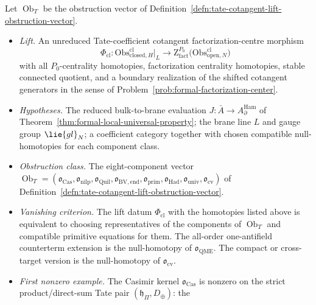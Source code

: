 \documentclass[11pt]{memoir}
\begin{document}
\begin{thm}\label{thm:tate-cotangent-lift-iff}
  Let \(\operatorname{Ob}_T\) be the obstruction vector of
  Definition~\ref{defn:tate-cotangent-lift-obstruction-vector}.
  \begin{itemize}
    \item \emph{Lift.}  An unreduced Tate-coefficient
      cotangent factorization-centre morphism
      \[
        \Phi_{\mathrm{cl}}\colon
        \mathrm{Obs}^{\mathrm{cl}}_{\mathrm{closed},H}\big|_L
          \longrightarrow
        \mathrm Z^{P_0}_{\mathrm{fact}}
          \bigl(\mathrm{Obs}^{\mathrm{cl}}_{\mathrm{open},N}\bigr)
      \]
      with all \(P_0\)-centrality homotopies, factorization centrality
      homotopies, stable connected quotient, and a boundary realization
      of the shifted cotangent generators in the sense of
      Problem~\ref{prob:formal-factorization-center}.
    \item \emph{Hypotheses.} The reduced bulk-to-brane
      evaluation \(J\colon\bar A\to A_\partial^{\mathrm{Ham}}\) of
      Theorem~\ref{thm:formal-local-universal-property}; the brane line
      \(L\) and gauge group \(\lie{gl}_N\); a coefficient category
      together with chosen compatible null-homotopies for each
      component class.
    \item \emph{Obstruction class.} The eight-component vector
      \(\operatorname{Ob}_T=(\mathfrak o_{\mathrm{Cas}},
        \mathfrak o_{\mathrm{nilp}},
        \mathfrak o_{\mathrm{Quil}},
        \mathfrak o_{\mathrm{BV,end}},
        \mathfrak o_{\mathrm{prim}},
        \mathfrak o_{\mathrm{Had}},
        \mathfrak o_{\mathrm{univ}},
        \mathfrak o_{\mathrm{cv}})\)
      of Definition~\ref{defn:tate-cotangent-lift-obstruction-vector}.
	    \item \emph{Vanishing criterion.}
	      The lift datum \(\Phi_{\mathrm{cl}}\) with the homotopies listed
	      above is equivalent to choosing representatives of the components
	      of \(\operatorname{Ob}_T\) and compatible primitive equations for
	      them.  The all-order one-antifield counterterm
		      extension is the null-homotopy of
      \(\mathfrak o_{\mathrm{QME}}\).  The compact or cross-target
      version is the null-homotopy of
      \(\mathfrak o_{\mathrm{cv}}\).
    \item \emph{First nonzero example.} The Casimir kernel
      \(\mathfrak o_{\mathrm{Cas}}\) is nonzero on the strict
      product/direct-sum Tate pair \((\mathfrak h_\Pi,D_\oplus)\): the

\end{itemize}
\end{thm}
\end{document}

